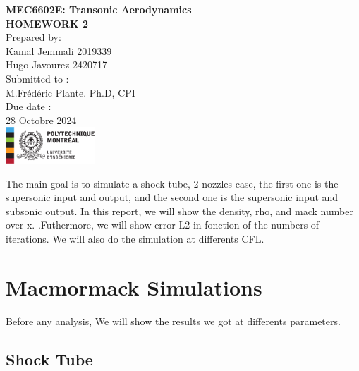 \documentclass[12pt]{article}
\begin{document}
\begin{titlepage}
    \centering
    \vspace*{5cm}
    
    {\Huge \textbf{MEC6602E: Transonic Aerodynamics}}\\[1.5cm]
    
    {\Large \textbf{HOMEWORK 2}}\\[2cm]
    
    {\Large Prepared by:}\\
    {\Large Kamal Jemmali 2019339}\\
    {\Large Hugo Javourez 2420717}\\[1.5cm]
    
    {\Large Submitted to :}\\
    {\Large M.Frédéric Plante. Ph.D, CPI}\\[2cm]
    
    {\Large Due date :}\\
    {\Large 28 Octobre 2024}\\
    
    \vfill
    \includegraphics[width=0.25\textwidth]{polytechnique-signature-rgb-gauche-fr.png} %
    
    \vfill
\end{titlepage}

The main goal is to simulate a shock tube, 2 nozzles case, the first one is the supersonic input and output,
and the second one is the supersonic input and subsonic output. In this report, we will show the density, rho, and mack number over x.
.Futhermore, we will show error L2 in fonction of the numbers of iterations. We will also do the simulation at differents CFL.
 

\section{Macmormack Simulations}

Before any analysis, We will show the results we got at differents parameters. 

\subsection{Shock Tube}
\end{document}
